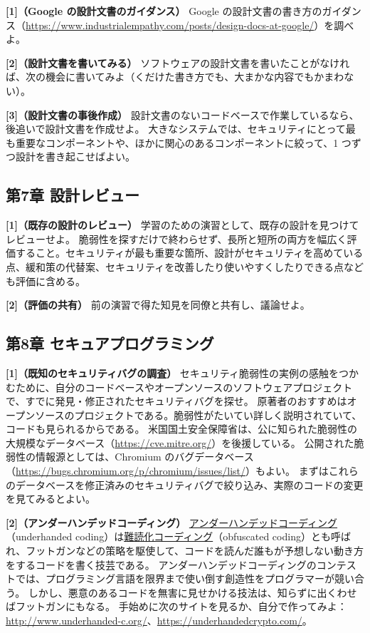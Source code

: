 \documentclass[uplatex]{jsarticle}
\begin{document}
\noindent\textbf{[1]（Google の設計文書のガイダンス）}\quad
Google の設計文書の書き方のガイダンス（\url{https://www.industrialempathy.com/posts/design-docs-at-google/}）を調べよ。

\noindent\textbf{[2]（設計文書を書いてみる）}\quad
ソフトウェアの設計文書を書いたことがなければ、次の機会に書いてみよ（くだけた書き方でも、大まかな内容でもかまわない）。

\noindent\textbf{[3]（設計文書の事後作成）}\quad
設計文書のないコードベースで作業しているなら、後追いで設計文書を作成せよ。
大きなシステムでは、セキュリティにとって最も重要なコンポーネントや、ほかに関心のあるコンポーネントに絞って、1 つずつ設計を書き起こせばよい。

\subsection{第7章 設計レビュー}

\noindent\textbf{[1]（既存の設計のレビュー）}\quad
学習のための演習として、既存の設計を見つけてレビューせよ。
脆弱性を探すだけで終わらせず、長所と短所の両方を幅広く評価すること。セキュリティが最も重要な箇所、設計がセキュリティを高めている点、緩和策の代替案、セキュリティを改善したり使いやすくしたりできる点なども評価に含める。

\noindent\textbf{[2]（評価の共有）}\quad
前の演習で得た知見を同僚と共有し、議論せよ。

\subsection{第8章 セキュアプログラミング}

\noindent\textbf{[1]（既知のセキュリティバグの調査）}\quad
セキュリティ脆弱性の実例の感触をつかむために、自分のコードベースやオープンソースのソフトウェアプロジェクトで、すでに発見・修正されたセキュリティバグを探せ。
原著者のおすすめはオープンソースのプロジェクトである。脆弱性がたいてい詳しく説明されていて、コードも見られるからである。
米国国土安全保障省は、公に知られた脆弱性の大規模なデータベース（\url{https://cve.mitre.org/}）を後援している。
公開された脆弱性の情報源としては、Chromium のバグデータベース（\url{https://bugs.chromium.org/p/chromium/issues/list/}）もよい。
まずはこれらのデータベースを修正済みのセキュリティバグで絞り込み、実際のコードの変更を見てみるとよい。

\noindent\textbf{[2]（アンダーハンデッドコーディング）}\quad
\underline{アンダーハンデッドコーディング}（underhanded coding）は\underline{難読化コーディング}（obfuscated coding）とも呼ばれ、フットガンなどの策略を駆使して、コードを読んだ誰もが予想しない動き方をするコードを書く技芸である。
アンダーハンデッドコーディングのコンテストでは、プログラミング言語を限界まで使い倒す創造性をプログラマーが競い合う。
しかし、悪意のあるコードを無害に見せかける技法は、知らずに出くわせばフットガンにもなる。
手始めに次のサイトを見るか、自分で作ってみよ：\url{http://www.underhanded-c.org/}、\url{https://underhandedcrypto.com/}。
\end{document}
